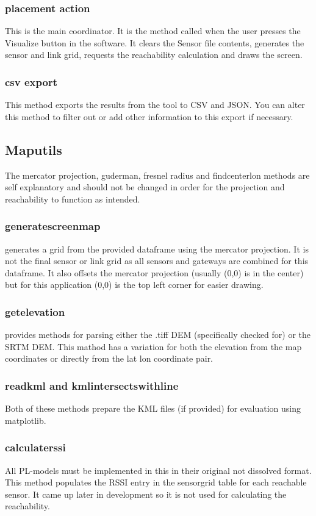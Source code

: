 \documentclass[12pt,a4paper]{article}
\begin{document}
\subsubsection{placement action}
This is the main coordinator. It is the method called when the user presses the Visualize button in the software. It clears the Sensor file contents, generates the sensor and link grid, requests the reachability calculation and draws the screen.
\subsubsection{csv export}
This method exports the results from the tool to CSV and JSON. You can alter this method to filter out or add other information to this export if necessary.
\subsection{Maputils}
The mercator projection, guderman, fresnel radius and findcenterlon methods are self explanatory and should not be changed in order for the projection and reachability to function as intended.
\subsubsection{generatescreenmap}
generates a grid from the provided dataframe using the mercator projection. It is not the final sensor or link grid as all sensors and gateways are combined for this dataframe. It also offsets the mercator projection (usually (0,0) is in the center) but for this application (0,0) is the top left corner for easier drawing.
\subsubsection{getelevation}
provides methods for parsing either the .tiff DEM (specifically checked for) or the SRTM DEM. This mathod has a variation for both the elevation from the map coordinates or directly from the lat lon coordinate pair.
\subsubsection{readkml and kmlintersectswithline}
Both of these methods prepare the KML files (if provided) for evaluation using matplotlib.
\subsubsection{calculaterssi}
All PL-models must be implemented in this in their original not dissolved format. This method populates the RSSI entry in the sensorgrid table for each reachable sensor. It came up later in development so it is not used for calculating the reachability.
\end{document}
